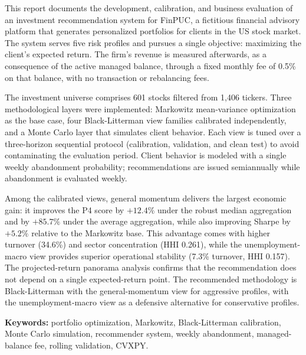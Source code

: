 This report documents the development, calibration, and business evaluation of an
investment recommendation system for FinPUC, a fictitious financial advisory
platform that generates personalized portfolios for clients in the US stock
market. The system serves five risk profiles and pursues a single objective:
maximizing the client's expected return. The firm's revenue is measured
afterwards, as a consequence of the active managed balance, through a fixed
monthly fee of 0.5\% on that balance, with no transaction or rebalancing fees.

The investment universe comprises 601 stocks filtered from 1,406 tickers. Three
methodological layers were implemented: Markowitz mean-variance optimization as
the base case, four Black-Litterman view families calibrated independently, and a
Monte Carlo layer that simulates client behavior. Each view is tuned over a
three-horizon sequential protocol (calibration, validation, and clean test) to
avoid contaminating the evaluation period. Client behavior is modeled with a
single weekly abandonment probability; recommendations are issued semiannually
while abandonment is evaluated weekly.

Among the calibrated views, general momentum delivers the largest economic gain:
it improves the P4 score by $+12.4\%$ under the robust median aggregation and by
$+85.7\%$ under the average aggregation, while also improving Sharpe by
$+5.2\%$ relative to the Markowitz base. This advantage comes with higher
turnover (34.6\%) and sector concentration (HHI 0.261), while the
unemployment-macro view provides superior operational stability (7.3\% turnover,
HHI 0.157). The projected-return panorama analysis confirms that the
recommendation does not depend on a single expected-return point. The
recommended methodology is Black-Litterman with the general-momentum view for
aggressive profiles, with the unemployment-macro view as a defensive alternative
for conservative profiles.

\textbf{Keywords:} portfolio optimization, Markowitz, Black-Litterman
calibration, Monte Carlo simulation, recommender system, weekly abandonment,
managed-balance fee, rolling validation, CVXPY.
